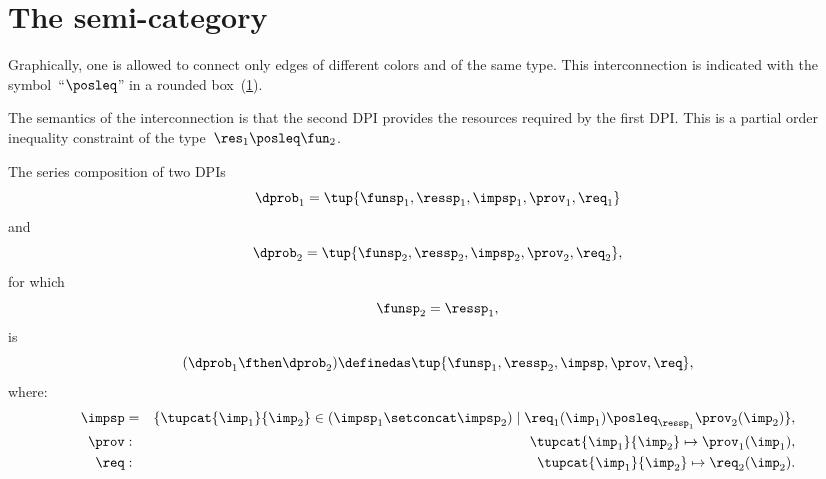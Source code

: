 

\section{The semi-category \DPI}


Graphically, one is allowed to connect only edges of different colors and of the same type. 
This interconnection is indicated with the symbol~``$\posleq$'' in a rounded box~(\cref{fig:connection}).

\begin{figure}[h]
  \centering
  \caption{\label{fig:connection}}
\end{figure}


The semantics of the interconnection is that the second DPI provides the resources required by the first DPI. 
This is a partial order inequality constraint of the type~$\res_{1}\posleq\fun_{2}$.


\begin{definition}
  \label{def:series-composition}The series composition of two DPIs
  \begin{equation}
    \dprob_{1}=\tup{\funsp_{1},\ressp_{1},\impsp_{1},\prov_{1},\req_{1}}
  \end{equation}
  and
  \begin{equation}
    \dprob_{2}=\tup{\funsp_{2},\ressp_{2},\impsp_{2},\prov_{2},
\req_{2}},
  \end{equation} 
  for which
  \begin{equation}\funsp_{2}=\ressp_{1},\end{equation} is
  \begin{equation}
    (\dprob_{1} \fthen \dprob_{2})
    \definedas
    \tup{ \funsp_{1},\ressp_{2},\impsp,\prov,\req},
  \end{equation}
  where:
  \begin{eqnarray}
    \impsp & = & \{  \tupcat {\imp_{1}} {\imp_{2}} \in (\impsp_{1} \setconcat \impsp_{2})\mid\req_{1}(\imp_{1})\posleq_{\ressp_{1}}\prov_{2}(\imp_{2})\},\\
    \prov & : & \tupcat {\imp_{1}} {\imp_{2}}   \mapsto\prov_{1}(\imp_{1}),\\
    \req & : & \tupcat {\imp_{1}} {\imp_{2}} \mapsto\req_{2}(\imp_{2}).
  \end{eqnarray}
\end{definition}

